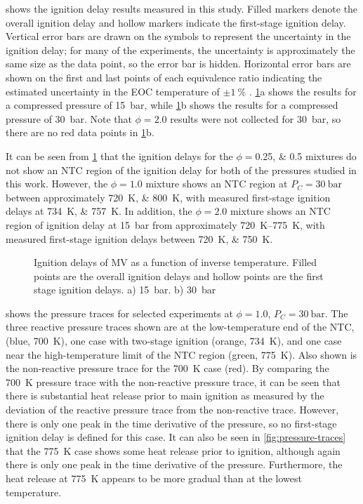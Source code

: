 \documentclass[12pt]{../ussci}
\begin{document}
 shows the ignition delay results measured in this
study. Filled markers denote the overall ignition delay and hollow markers
indicate the first-stage ignition delay. Vertical error bars are drawn on the
symbols to represent the uncertainty in the ignition delay; for many of the
experiments, the uncertainty is approximately the same size as the data point,
so the error bar is hidden. Horizontal error bars are shown on the first and
last points of each equivalence ratio indicating the estimated uncertainty in
the EOC temperature of $\pm\SI{1}{\percent}$ \cite{Weber2015}.
\cref{fig:ignition-delays}a shows the results for a compressed pressure of
\SI{15}{\bar}, while \cref{fig:ignition-delays}b shows the results for a
compressed pressure of \SI{30}{\bar}. Note that $\phi=2.0$ results were not
collected for \SI{30}{\bar}, so there are no red data points in
\cref{fig:ignition-delays}b.

It can be seen from \cref{fig:ignition-delays} that the ignition delays for the
\(\phi=\)\numlist{0.25;0.5} mixtures do not show an NTC region of the ignition
delay for both of the pressures studied in this work. However, the $\phi=1.0$
mixture shows an NTC region at $P_C=\SI{30}{\bar}$ between approximately
\SIlist{720;800}{\K}, with measured first-stage ignition delays at
\SIlist{734;757}{\K}. In addition, the $\phi=2.0$ mixture shows an NTC region of
ignition delay at \SI{15}{\bar} from approximately \SIrange{720}{775}{\K}, with
measured first-stage ignition delays between \SIlist{720;750}{\K}.

\begin{figure}[htb]
    \centering
    
    \caption{Ignition delays of MV as a function of inverse temperature. Filled
    points are the overall ignition delays and hollow points are the first stage
    ignition delays. a) \SI{15}{\bar}. b) \SI{30}{\bar}}
    \label{fig:ignition-delays}
\end{figure}

 shows the pressure traces for selected experiments at
\(\phi=1.0\), \(P_C =\SI{30}{\bar}\). The three reactive pressure traces shown
are at the low-temperature end of the NTC, (blue, \SI{700}{\K}), one case with
two-stage ignition (orange, \SI{734}{\K}), and one case near the
high-temperature limit of the NTC region (green, \SI{775}{\K}). Also shown is
the non-reactive pressure trace for the \SI{700}{\K} case (red). By comparing
the \SI{700}{\K} pressure trace with the non-reactive pressure trace, it can be
seen that there is substantial heat release prior to main ignition as measured
by the deviation of the reactive pressure trace from the non-reactive trace.
However, there is only one peak in the time derivative of the pressure, so no
first-stage ignition delay is defined for this case. It can also be seen in
\cref{fig:pressure-traces} that the \SI{775}{\K} case shows some heat release
prior to ignition, although again there is only one peak in the time derivative
of the pressure. Furthermore, the heat release at \SI{775}{\K} appears to be
more gradual than at the lowest temperature.
\end{document}
